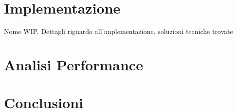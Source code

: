 \documentclass[12pt,italian]{report}
\begin{document}
	
	\chapter{Implementazione}
	\label{cap:implementazione}
	Nome WIP. Dettagli riguardo all'implementazione, soluzioni tecniche trovate
	
	
	\chapter{Analisi Performance}
	\label{cap:dati}
	
	\chapter{Conclusioni}
	\label{cap:conclusioni}
	
	
	
\end{document}

